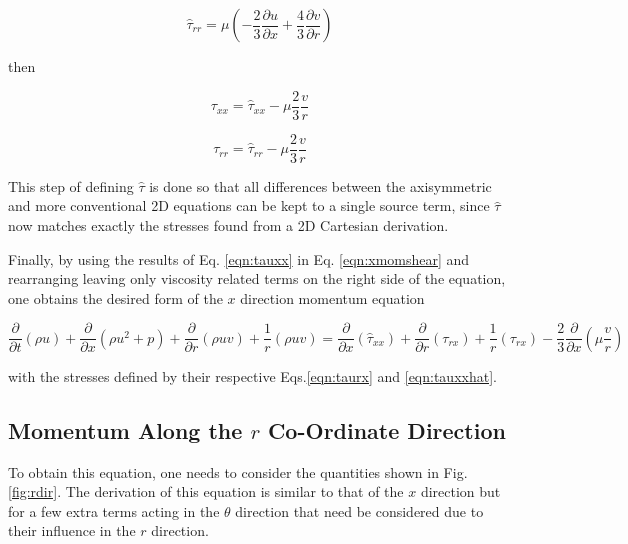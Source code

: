 \begin{equation}
	\hat{\tau}_{rr} =  \mu ( - \frac{2}{3} \frac{\partial u}{\partial x} + \frac{4}{3} \frac{\partial v}{\partial r})  
\label{eqn:taurrhat}
\end{equation}

	then

\begin{equation}
	\tau_{xx} = \hat{\tau}_{xx} - \mu \frac{2}{3} \frac {v}{r}
\label{eqn:tauxx}
\end{equation}

\begin{equation}
	\tau_{rr} = \hat{\tau}_{rr} - \mu \frac{2}{3} \frac{v}{r}
\label{eqn:taurr}
\end{equation}

	This step of defining $\hat{\tau}$ is done so that all differences between the axisymmetric and more
conventional 2D equations can be kept to a single source term, since $\hat{\tau}$ now matches exactly the stresses
found from a 2D Cartesian derivation.
	
	Finally, by using the results of Eq. \ref{eqn:tauxx} in Eq. \ref{eqn:xmomshear} and 
rearranging leaving only viscosity related terms on the right side of the equation, one obtains the 
desired form of the $x$ direction momentum equation

\begin{equation}
\frac{\partial}{\partial t}(\rho u) + \frac{\partial}{\partial x}(\rho u^2 + p) +
\frac{\partial}{\partial r}(\rho uv) + \frac{1}{r}(\rho u v) = 
\frac{\partial}{\partial x}(\hat{\tau}_{xx}) + \frac{\partial}{\partial r}(\tau_{rx}) + 
\frac{1}{r}(\tau_{rx}) - \frac{2}{3} \frac{\partial}{\partial x}(\mu \frac{v}{r})
\label{eqn:xmom}
\end{equation}

	with the stresses defined by their respective Eqs.\ref{eqn:taurx} and \ref{eqn:tauxxhat}.

\subsection{Momentum Along the $r$ Co-Ordinate Direction}

	To obtain this equation, one needs to consider the quantities shown in Fig. \ref{fig:rdir}.  The derivation of 
this equation is similar to that of the $x$ direction but for a few extra terms acting in the $\theta$ direction that need 
be considered due to their influence in the $r$ direction.

